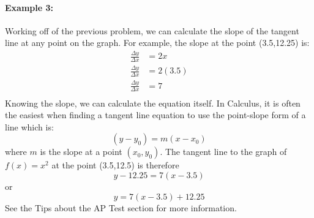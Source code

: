 \documentclass[../revisedmain.tex]{subfiles}
\begin{document}
	\paragraph{Example 3:} Working off of the previous problem, we can calculate the slope of the tangent line at any point on the graph. For example, the slope at the point (3.5,12.25) is:
	\begin{equation}
		\begin{split}
		\frac{\Delta y}{\Delta x}&=2x\\
		\frac{\Delta y}{\Delta x}&=2(3.5)\\
		\frac{\Delta y}{\Delta x}&=7\\
		\end{split}
	\end{equation}
	Knowing the slope, we can calculate the equation itself. In Calculus, it is often the easiest when finding a tangent line equation to use the point-slope form of a line which is: \[(y-y_0)=m(x-x_0)\] where \(m\) is the slope at a point \((x_0,y_0)\). The tangent line to the graph of \(f(x)=x^2\) at the point (3.5,12.5) is therefore \[y-12.25=7(x-3.5)\] or \[y=7(x-3.5)+12.25\] See the Tips about the AP Test section for more information.\\\\
\end{document}
